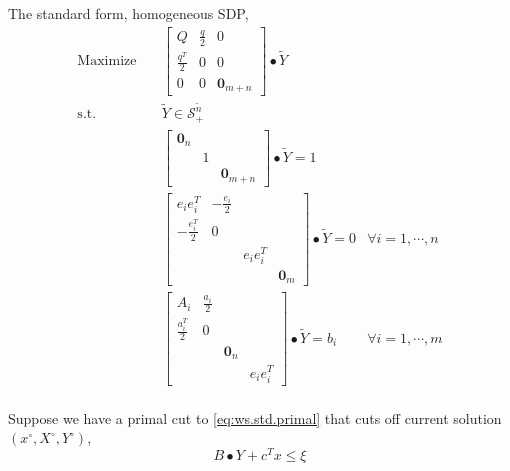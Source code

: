 \documentclass[../main]{subfiles}
\begin{document}
The standard form, homogeneous SDP,
\begin{equation}
    \begin{aligned}
        \mathrm{Maximize}\quad & \begin{bmatrix}
            Q & \frac{q}{2} & 0 \\ \frac{q^T}{2} & 0 & 0 \\ 0 & 0 & \bm 0_{m+n}
        \end{bmatrix} \bullet \tilde Y                               \\
        \mathrm{s.t.} \quad    & \tilde{Y}  \in \mathscr S^{\tilde{n}}_+                                   \\
                               & \begin{bmatrix}  \bm 0_n &  &  \\  & 1 &  \\  & & \bm 0_{m+n} \end{bmatrix} \bullet \tilde Y = 1                           \\
                               & \begin{bmatrix}
            e_ie_i^T         & -\frac{e_i}{2} &          &         \\
            -\frac{e_i^T}{2} & 0              &          &         \\
                             &                & e_ie_i^T &         \\
                             &                &          & \bm 0_m
        \end{bmatrix} \bullet \tilde Y = 0   & \forall i=1,\cdots, n \\
                               & \begin{bmatrix}
            A_i             & \frac{a_i}{2} &         &          \\
            \frac{a_i^T}{2} & 0             &         &          \\
                            &               & \bm 0_n &          \\
                            &               &         & e_ie_i^T
        \end{bmatrix}\bullet \tilde{Y} = b_i & \forall i=1,\cdots, m \\
    \end{aligned}
\end{equation}

Suppose we have a primal cut to \eqref{eq:ws.std.primal}
that cuts off current solution \((x^\circ, X^\circ, Y^\circ)\),
\begin{equation*}
    B\bullet Y + c^T x \le \xi
\end{equation*}
\end{document}

